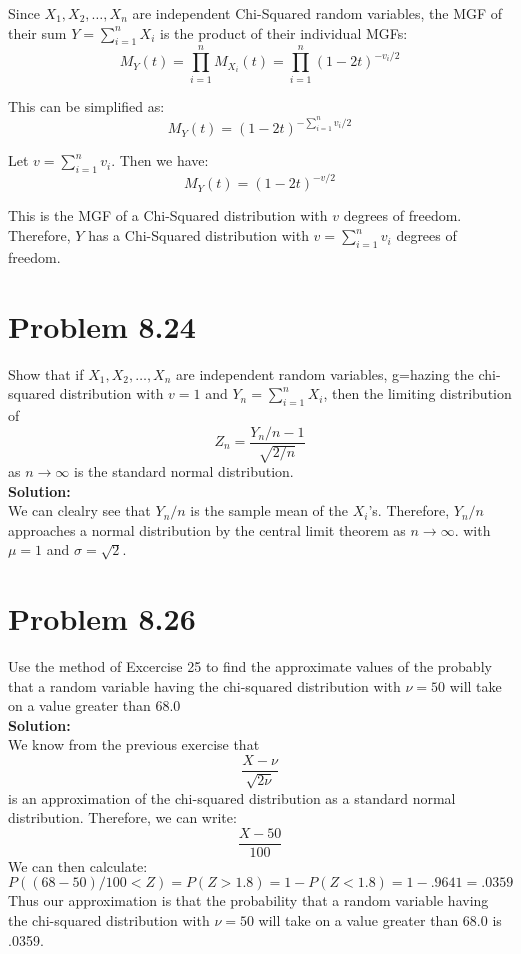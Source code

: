 \documentclass{article}
\begin{document}
Since \( X_1, X_2, \ldots, X_n \) are independent Chi-Squared random variables, the MGF of their sum \( Y = \sum_{i=1}^{n} X_i \) is the product of their individual MGFs:
\[ M_Y(t) = \prod_{i=1}^{n} M_{X_i}(t) = \prod_{i=1}^{n} (1 - 2t)^{-v_i/2} \]

This can be simplified as:
\[ M_Y(t) = (1 - 2t)^{-\sum_{i=1}^{n} v_i / 2} \]

Let \( v = \sum_{i=1}^{n} v_i \). Then we have:
\[ M_Y(t) = (1 - 2t)^{-v/2} \]

This is the MGF of a Chi-Squared distribution with \( v \) degrees of freedom. Therefore, \( Y \) has a Chi-Squared distribution with \( v = \sum_{i=1}^{n} v_i \) degrees of freedom.

\section*{Problem 8.24}
Show that if $X_1, X_2, \ldots, X_n$ are independent random variables, g=hazing the chi-squared distribution with $v=1$ and $Y_n = \sum_{i=1}^{n} X_i$, then the limiting distribution of 
$$ Z_n = \frac{Y_n/n - 1}{\sqrt{2/n}} $$
as $n \rightarrow \infty$ is the standard normal distribution.\\
\textbf{Solution:}\\
We can clealry see that $Y_n/n$ is the sample mean of the $X_i$'s. Therefore, $Y_n/n$ approaches a normal distribution by the central limit theorem as $n \rightarrow \infty$. with $\mu = 1$ and $\sigma = \sqrt{2}$.\\


\section*{Problem 8.26}
Use the method of Excercise 25 to find the approximate values of the probably that a random variable having the chi-squared distribution with $\nu = 50$ will take on a value greater than 68.0\\
\textbf{Solution:}\\
We know from the previous exercise that 
$$ \frac{X - \nu}{\sqrt{2\nu}} $$
is an approximation of the chi-squared distribution as a standard normal distribution. Therefore, we can write:
$$ \frac{X - 50}{100}$$
We can then calculate:
$$ P((68-50)/100 < Z ) = P(Z > 1.8) = 1 - P(Z < 1.8) = 1 - .9641 = .0359 $$
Thus our approximation is that the probability that a random variable having the chi-squared distribution with $\nu = 50$ will take on a value greater than 68.0 is .0359.\\
\end{document}

